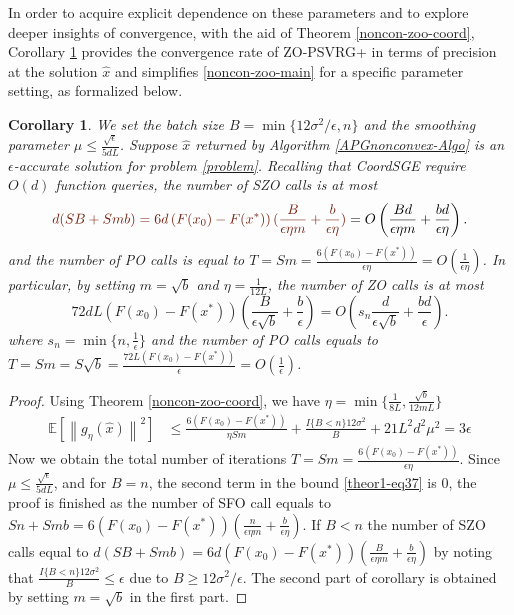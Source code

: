 \documentclass{article}
\newcommand*{\E}{\mathbb{E}}
\newcommand{\norm}[1]{\left\lVert#1\right\rVert}
\newtheorem{corollary}[theorem]{Corollary}
\theoremstyle{definition}
\theoremstyle{remark}
\begin{document}
{\color{Brown}
In order to acquire explicit dependence on these parameters and to explore deeper insights of convergence, with the aid of Theorem \ref{noncon-zoo-coord}, Corollary \ref{corr11} provides the convergence rate of ZO-PSVRG+ in terms of precision at the solution $\hat{x}$ and  simplifies \eqref{noncon-zoo-main} for a specific parameter setting, as formalized below.
}


 \begin{corollary}\label{corr11}
We set the batch size $B = \min\{12\sigma^2/\epsilon, n\}$ and the smoothing parameter $\mu \leq \frac{\sqrt{\epsilon}}{5{dL}}$. Suppose $\hat{x}$ returned by Algorithm \ref{APGnonconvex-Algo}  is an $\epsilon$-accurate solution for problem \eqref{problem}. Recalling that CoordSGE require $O(d)$ function queries, the number of SZO calls is at most 
\begin{equation}\label{SZO-call-nocon}
{\color{Brown}d(SB+Smb) = 6d \left(F(x_0) - F({x}^*)\right) (\frac{B}{\epsilon\eta m}+\frac{b}{\epsilon\eta})} = O\left(\frac{Bd}{\epsilon\eta m}+\frac{bd}{\epsilon\eta}\right).
\end{equation} 
and the number of PO calls is equal to $T = Sm = \frac{6\left(F(x_0) - F({x}^*)\right)}{\epsilon\eta} = O\left(\frac{1}{\epsilon\eta}\right)$. In particular, by setting $m=\sqrt{b}$ and {\color{Brown}$\eta = \frac{1}{12L}$}, the number of ZO calls is at most 
\begin{equation}\label{SZO-call-par-nocon}
72d L (F(x_0)-F(x^*))\left(\frac{B}{\epsilon\sqrt{b}}+\frac{b}{\epsilon}\right) = O\left(s_n\frac{d}{\epsilon \sqrt{b}}+\frac{bd}{\epsilon}\right).
\end{equation}
where $s_n = \min\{n,\frac{1}{\epsilon}\}$ and the number of PO calls equals to $T = Sm = S\sqrt{b} = \frac{72 L \left(F(x_0) - F({x}^*)\right)}{\epsilon} = O\left(\frac{1}{\epsilon}\right)$. 
\end{corollary}
\begin{proof}
Using Theorem \ref{noncon-zoo-coord}, we have $\eta = \min\{\frac{1}{8L}, \frac{\sqrt{b}}{12mL}\}$
\begin{align}
\E[\norm{g_{\eta}(\hat{x})}^2] & \leq \frac{6\left(F(x_0) - F({x}^*)\right)}{\eta Sm} + \frac{I\{B < n\}12 \sigma ^2}{B}+21{L^2 d^2 \mu^2} = 3\epsilon\label{theor1-eq37}
 \end{align} 
 Now we obtain the total number of iterations  {\color{Brown} $T = Sm = \frac{6\left(F(x_0) - F({x}^*)\right)}{\epsilon\eta}$}. Since $\mu \leq \frac{\sqrt{\epsilon}}{5{dL}}$, and for $B = n$, the second term in the bound \eqref{theor1-eq37} is $0$, the proof is finished as the number of SFO call equals to {\color{Brown}$Sn+Smb = 6 \left(F(x_0) - F({x}^*)\right) (\frac{n}{\epsilon\eta m}+\frac{b}{\epsilon\eta})$}. If  $B < n$ the number of SZO calls equal to  {\color{Brown}$d(SB+Smb) = 6d \left(F(x_0) - F({x}^*)\right) (\frac{B}{\epsilon\eta m}+\frac{b}{\epsilon\eta})$} by noting that $\frac{I\{B < n\}12\sigma^2}{B} \leq \epsilon$ due to $B \geq 12\sigma^2 /\epsilon$. The second part of corollary is obtained by setting $m = \sqrt{b}$ in the first part.
\end{proof}
\end{document}
